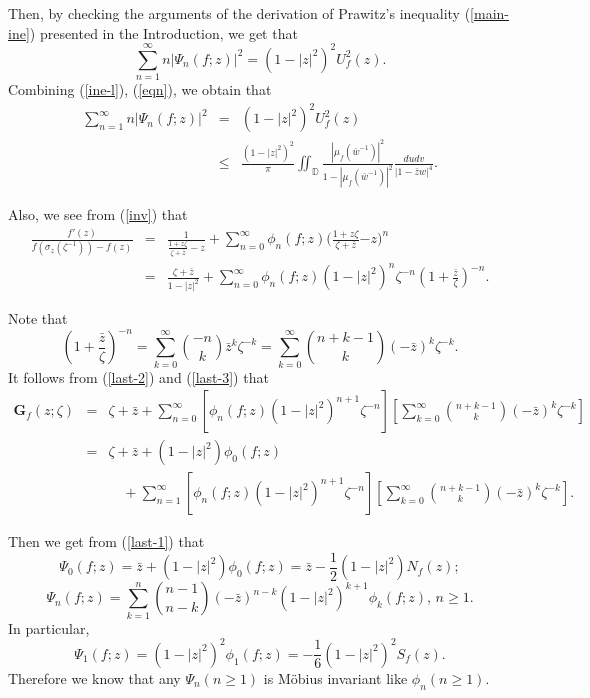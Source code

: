 \documentclass[10pt]{amsart}
\theoremstyle{definition}
\theoremstyle{remark}
\numberwithin{equation}{section}
\begin{document}
Then, by checking the arguments of the derivation of Prawitz's inequality (\ref{main-ine}) presented in the Introduction, we get that 
\begin{equation}\label{eqn}
\sum_{n=1}^{\infty}n|\Psi_n(f; z)|^2=(1-|z|^2)^{2}U_{f}^2(z).
\end{equation} 
Combining (\ref{ine-l}), (\ref{eqn}), we obtain that
\begin{eqnarray}\label{eqn-1}
\sum_{n=1}^{\infty}n|\Psi_n(f; z)|^2&=&(1-|z|^2)^{2}U_f^2(z) \nonumber \\&\leq& \frac{(1-|z|^2)^{2}}{\pi}\iint_{\mathbb{D}} \frac{|\mu_{f}({\bar{w}}^{-1})|^2}{1-|\mu_f({\bar{w}}^{-1})|^2}\frac{dudv}{|1-\bar{z}w|^4}.
\end{eqnarray}
 
Also, we see from (\ref{inv}) that
\begin{eqnarray}\label{last-2}
\frac{f'(z)}{f\left(\sigma_z({\zeta}^{-1})\right)-f(z)}&=& \frac{1}{\frac{1+z\zeta}{\zeta+\bar{z}}-z}+\sum_{n=0}^{\infty} \phi_{n}(f ; z)(\frac{1+z\zeta}{\zeta+\bar{z}}{-z)}^n
\\
&=&   \frac{\zeta+\bar{z}}{1-|z|^2}+\sum_{n=0}^{\infty} \phi_{n}(f ; z)(1-|z|^2)^n \zeta ^{-n}(1+\frac{\bar{z}}{\zeta})^{-n}.  \nonumber
\end{eqnarray}

Note that 
\begin{equation}\label{last-3}
 (1+\frac{\bar{z}}{\zeta})^{-n}=\sum_{k=0}^{\infty}\binom{-n}{k} {\bar{z}}^{k}{\zeta}^{-k}=\sum_{k=0}^{\infty}\binom{n+k-1}{k} {(-\bar{z})}^{k}{\zeta}^{-k}.\end{equation}
It follows from (\ref{last-2}) and (\ref{last-3})  that
\begin{eqnarray}
\mathbf{G}_{f}(z; \zeta)&=&\zeta+\bar{z}+\sum_{n=0}^{\infty}\left[\phi_{n}(f; z)(1-|z|^2)^{n+1} \zeta ^{-n}\right]\left[ \sum_{k=0}^{\infty}\binom{n+k-1}{k}{(-\bar{z})}^{k}{\zeta}^{-k} \right] \nonumber \\
&=&\zeta+\bar{z}+(1-|z|^2)\phi_0(f ; z)\nonumber \\
& & \quad+\sum_{n=1}^{\infty}\left[\phi_{n}(f; z)(1-|z|^2)^{n+1} \zeta ^{-n}\right]\left[\sum_{k=0}^{\infty}\binom{n+k-1}{k}{(-\bar{z})}^{k}{\zeta}^{-k} \right]. \nonumber
\end{eqnarray}

Then we get from (\ref{last-1}) that
\begin{equation}
\Psi_0(f; z)=\bar{z}+(1-|z|^2)\phi_0(f; z)=\bar{z}-\frac{1}{2}(1-|z|^2)N_{f}(z); \nonumber
\end{equation}
\begin{equation}\label{last-4}
\Psi_n(f; z)=\sum_{k=1}^{n}\binom{n-1}{n-k}(-\bar{z})^{n-k}(1-|z|^2)^{k+1} \phi_k(f; z),\, n\geq 1. 
\end{equation}
In particular, $$\Psi_1(f; z)=(1-|z|^2)^{2}\phi_1(f; z)=-\frac{1}{6}(1-|z|^2)^{2}S_{f}(z).$$
Therefore we know that any $\Psi_n(n\geq 1)$ is Möbius invariant like $\phi_n(n\geq 1)$.
\end{document}
